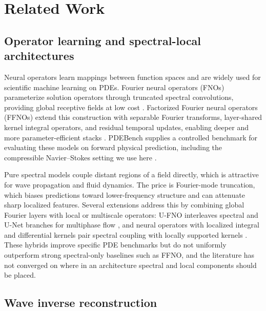 \documentclass[11pt]{article}
\begin{document}
\section{Related Work}


\subsection{Operator learning and spectral-local architectures}

Neural operators learn mappings between function spaces and are widely used
for scientific machine learning on PDEs. Fourier neural operators (FNOs)
parameterize solution operators through truncated spectral convolutions,
providing global receptive fields at low cost \cite{fno}. Factorized Fourier
neural operators (FFNOs) extend this construction with separable Fourier
transforms, layer-shared kernel integral operators, and residual temporal
updates, enabling deeper and more parameter-efficient stacks \cite{ffno}.
PDEBench supplies a controlled benchmark for evaluating these models on
forward physical prediction, including the compressible Navier--Stokes setting
we use here \cite{pdebench}.

Pure spectral models couple distant regions of a field directly, which is
attractive for wave propagation and fluid dynamics. The price is Fourier-mode
truncation, which biases predictions toward lower-frequency structure and can
attenuate sharp localized features. Several extensions address this by
combining global Fourier layers with local or multiscale operators: U-FNO
interleaves spectral and U-Net branches for multiphase flow \cite{ufno}, and
neural operators with localized integral and differential kernels pair spectral
coupling with locally supported kernels \cite{localno}. These hybrids improve
specific PDE benchmarks but do not uniformly outperform strong spectral-only
baselines such as FFNO, and the literature has not converged on where in an
architecture spectral and local components should be placed.

\subsection{Wave inverse reconstruction}
\end{document}
